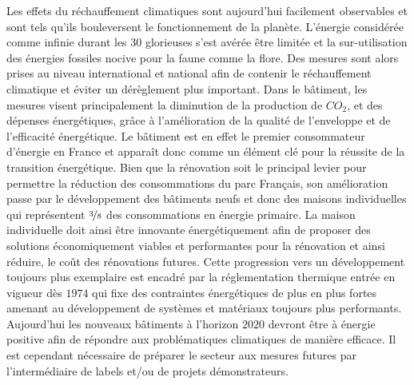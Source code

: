 
Les effets du réchauffement climatiques sont aujourd’hui facilement observables et sont
tels qu’ils bouleversent le fonctionnement de la planète. L’énergie considérée comme
infinie durant les \num{30} glorieuses s’est avérée être limitée et la sur-utilisation des
énergies fossiles nocive pour la faune comme la flore. Des mesures sont alors prises au
niveau international et national afin de contenir le réchauffement climatique et éviter un
dérèglement plus important. Dans le bâtiment, les mesures visent principalement la
diminution de la production de $CO_{2}$, et des dépenses énergétiques, grâce à
l’amélioration de la qualité de l’enveloppe et de l’efficacité énergétique. Le bâtiment
est en effet le premier consommateur d’énergie en France et apparaît donc comme un élément
clé pour la réussite de la transition énergétique. Bien que la rénovation soit le
principal levier pour permettre la réduction des consommations du parc Français, son
amélioration passe par le développement des bâtiments neufs et donc des maisons
individuelles qui représentent $\nicefrac{3}{8}$ des consommations en énergie primaire. La
maison individuelle doit ainsi être innovante énergétiquement afin de proposer des
solutions économiquement viables et performantes pour la rénovation et ainsi réduire, le
coût des rénovations futures. Cette progression vers un développement toujours plus
exemplaire est encadré par la réglementation thermique entrée en vigueur dès $1974$ qui
fixe des contraintes énergétiques de plus en plus fortes amenant au développement de
systèmes et matériaux toujours plus performants. Aujourd’hui les nouveaux bâtiments à
l’horizon $2020$ devront être à énergie positive afin de répondre aux problématiques
climatiques de manière efficace. Il est cependant nécessaire de préparer le secteur aux
mesures futures par l’intermédiaire de labels et/ou de projets démonstrateurs.

